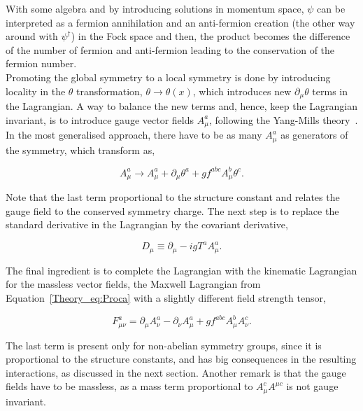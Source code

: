 With some algebra and by introducing solutions in momentum space, $\psi$ can be interpreted as a fermion annihilation and an anti-fermion creation (the other way around with $\psi^\dag$) in the Fock space and then, the product becomes the difference of the number of fermion and anti-fermion leading to the conservation of the fermion number.\\

Promoting the global symmetry to a local symmetry is done by introducing locality in the $\theta$ transformation,
$\theta \rightarrow\theta(x)$, which introduces new $\partial_\mu\theta$ terms in the Lagrangian.
A way to balance the new terms and, hence, keep the Lagrangian invariant, is to introduce gauge vector fields $A_\mu^a$,
following the Yang-Mills theory~\cite{YangMills}. In the most generalised approach, there have to be as many $A_\mu^a$
as generators of the symmetry, which transform as,

\begin{equation}
    A_\mu^a \rightarrow A_\mu^a + \partial_\mu\theta^a + gf^{abc}A_\mu^b\theta^c.
\end{equation}

Note that the last term proportional to the structure constant and relates the gauge field to the conserved symmetry charge.
The next step is to replace the standard derivative in the Lagrangian by the covariant derivative,

\begin{equation}
    D_\mu\equiv\partial_\mu - igT^aA_\mu^a.
\end{equation}

The final ingredient is to complete the Lagrangian with the kinematic Lagrangian for the massless vector fields,
the Maxwell Lagrangian from Equation~\ref{Theory_eq:Proca} with a slightly different field strength tensor,

\begin{equation}
    F_{\mu\nu}^a=\partial_\mu A_\nu^a - \partial_\nu A_\mu^a + gf^{abc}A_\mu^bA_\nu^c.
\end{equation}

The last term is present only for non-abelian symmetry groups, since it is proportional to the structure constants, and has big consequences in the resulting interactions, as discussed in the next section.
Another remark is that the gauge fields have to be massless, as a mass term proportional to $A_\mu^cA^{\mu c}$ is not gauge invariant.\\

